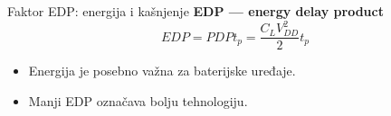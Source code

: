 \begin{frame}[label=09_2-s061]{Faktor EDP: energija i kašnjenje}
\textbf{EDP — energy delay product}\[EDP=PDPt_p=\frac{C_LV_{DD}^2}2t_p\]
\begin{itemize}
\item Energija je posebno važna za baterijske uređaje.
\item Manji EDP označava bolju tehnologiju.
\end{itemize}
\end{frame}
